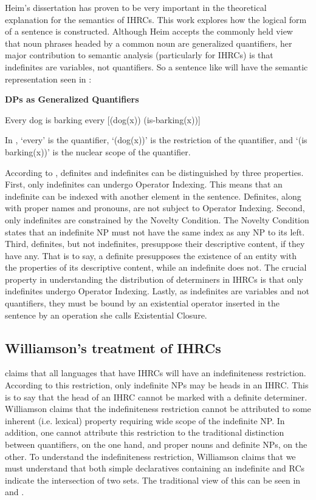 \documentclass[output=paper]{LSP/langsci}
\begin{document}
Heim's \citeyear{Heim1982} dissertation has proven to be very important in the theoretical explanation for the semantics of IHRCs. This work explores how the logical form of a sentence is constructed. Although Heim accepts the commonly held view that noun phrases headed by a common noun are generalized quantifiers, her major contribution to semantic analysis (particularly for IHRCs) is that indefinites are variables, not quantifiers.  So a sentence like  will have the semantic representation seen in :

\ea \textbf{DPs as Generalized Quantifiers}
\begin{xlist}
\ex Every dog is barking \label{boyle39a}
\ex every [(dog(x)) (is-barking(x))] \label{boyle39b}
\end{xlist}
\z

In , `every' is the quantifier, `(dog(x))' is the restriction of the quantifier, and `(is barking(x))' is the nuclear scope of the quantifier.  

According to \citet{Heim1982}, definites and indefinites can be distinguished by three properties. First, only indefinites can undergo Operator Indexing. This means that an indefinite can be indexed with another element in the sentence. Definites, along with proper names and pronouns, are not subject to Operator Indexing. Second, only indefinites are constrained by the Novelty Condition. The Novelty Condition states that an indefinite NP must not have the same index as any NP to its left. Third, definites, but not indefinites, presuppose their descriptive content, if they have any.  That is to say, a definite presupposes the existence of an entity with the properties of its descriptive content, while an indefinite does not. The crucial property in understanding the distribution of determiners in IHRCs is that only indefinites undergo Operator Indexing. Lastly, as indefinites are variables and not quantifiers, they must be bound by an existential operator inserted in the sentence by an operation she calls Existential Closure.

\subsection{Williamson's treatment of IHRCs}\label{sec:boyle:6.2}

\citet{Williamson1987} claims that all languages that have IHRCs will have an indefiniteness restriction. According to this restriction, only indefinite NPs may be heads in an IHRC. This is to say that the head of an IHRC cannot be marked with a definite determiner. Williamson claims that the indefiniteness restriction cannot be attributed to some inherent (i.e. lexical) property requiring wide scope of the indefinite NP. In addition, one cannot attribute this restriction to the traditional distinction between quantifiers, on the one hand, and proper nouns and definite NPs, on the other. To understand the indefiniteness restriction, Williamson claims that we must understand that both simple declaratives containing an indefinite and RCs indicate the intersection of two sets. The traditional view of this can be seen in  and .
\end{document}
